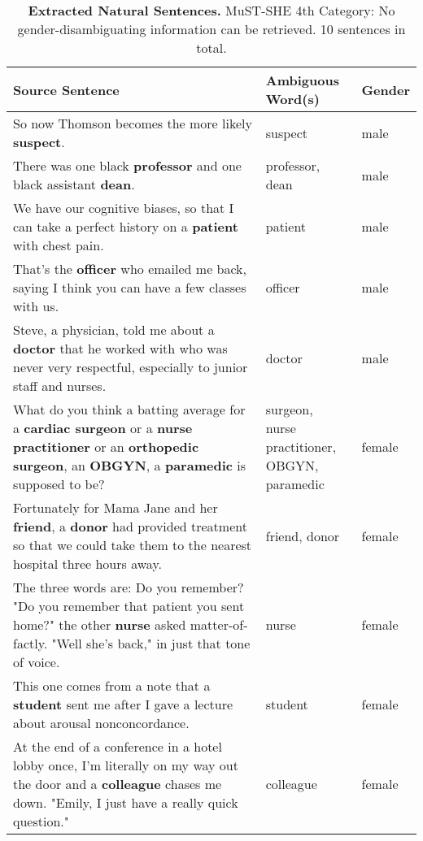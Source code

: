 \begin{table}[!htb]
    \begin{tabularx}{\linewidth}{|X|l|l|}
        \hline
        \textbf{Source Sentence} & \textbf{Ambiguous Word(s)} & \textbf{Gender} \\ \hline
        So now Thomson becomes the more likely \textbf{suspect}. & suspect & male \\ \hline
        There was one black \textbf{professor} and one black assistant \textbf{dean}. & professor, dean & male \\ \hline
        We have our cognitive biases, so that I can take a perfect history on a \textbf{patient} with chest pain. & patient & male \\ \hline
        That's the \textbf{officer} who emailed me back, saying I think you can have a few classes with us.  & officer & male \\ \hline
        Steve, a physician, told me about a \textbf{doctor} that he worked with who was never very respectful, especially to junior staff and nurses. & doctor & male \\ \hline
        What do you think a batting average for a \textbf{cardiac surgeon} or a \textbf{nurse practitioner} or an \textbf{orthopedic surgeon}, an \textbf{OBGYN}, a \textbf{paramedic} is supposed to be? & \makecell[tl]{surgeon, \\ nurse practitioner, \\ OBGYN, paramedic} & female \\ \hline
        Fortunately for Mama Jane and her \textbf{friend}, a \textbf{donor} had provided treatment so that we could take them to the nearest hospital three hours away. & friend, donor & female \\ \hline
        The three words are: Do you remember? "Do you remember that patient you sent home?" the other \textbf{nurse} asked matter-of-factly. "Well she's back," in just that tone of voice. & nurse & female \\ \hline
        This one comes from a note that a \textbf{student} sent me after I gave a lecture about arousal nonconcordance. & student & female \\ \hline
        At the end of a conference in a hotel lobby once, I'm literally on my way out the door and a \textbf{colleague} chases me down. "Emily, I just have a really quick question."  & colleague & female \\ \hline
    \end{tabularx}
    \caption[Extracted Natural Sentences]{\textbf{Extracted Natural Sentences.} MuST-SHE 4th Category: No gender-disambiguating information can be retrieved. 10 sentences in total.}
    \label{tab:mustshe_sentences}
\end{table}

